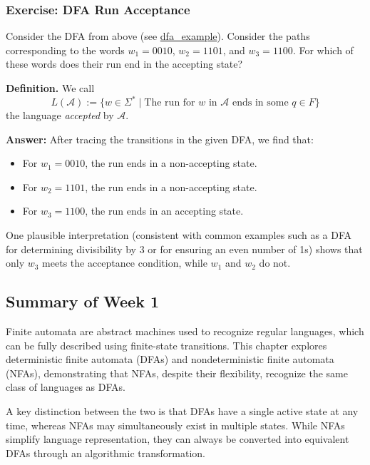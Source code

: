 \documentclass{article}
\theoremstyle{theorem}
\theoremstyle{definition}
\theoremstyle{remark}
\begin{document}
\subsubsection{Exercise: DFA Run Acceptance}

Consider the DFA from above (see \href{https://hackmd.io/_uploads/ByLSmw_tyl.jpg}{dfa\_example}). Consider the paths corresponding to the words \(w_1 = 0010\), \(w_2 = 1101\), and \(w_3 = 1100\). For which of these words does their run end in the accepting state?

\textbf{Definition.} We call
\[
L(\mathcal{A}) := \{w \in \Sigma^* \; | \; \text{The run for \(w\) in \(\mathcal{A}\) ends in some \(q \in F\)} \}
\]
the language \textit{accepted} by \(\mathcal{A}\).

\newpage

\textbf{Answer:} After tracing the transitions in the given DFA, we find that:
\begin{itemize}
    \item For \(w_1 = 0010\), the run ends in a non-accepting state.
    \item For \(w_2 = 1101\), the run ends in a non-accepting state.
    \item For \(w_3 = 1100\), the run ends in an accepting state.
\end{itemize}

One plausible interpretation (consistent with common examples such as a DFA for determining divisibility by 3 or for ensuring an even number of 1s) shows that only \(w_3\) meets the acceptance condition, while \(w_1\) and \(w_2\) do not.

\subsection{Summary of Week 1}

Finite automata are abstract machines used to recognize regular languages, which can be fully described using finite-state transitions. This chapter explores deterministic finite automata (DFAs) and nondeterministic finite automata (NFAs), demonstrating that NFAs, despite their flexibility, recognize the same class of languages as DFAs.

A key distinction between the two is that DFAs have a single active state at any time, whereas NFAs may simultaneously exist in multiple states. While NFAs simplify language representation, they can always be converted into equivalent DFAs through an algorithmic transformation.
\end{document}
